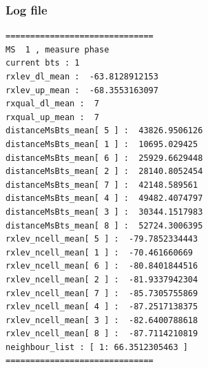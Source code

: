 \documentclass{beamer}
\begin{document}
\begin{frame}[fragile]
\frametitle{Log file}

{\tiny
\begin{verbatim}
==============================
MS  1 , measure phase
current bts : 1
rxlev_dl_mean :  -63.8128912153
rxlev_up_mean :  -68.3553163097
rxqual_dl_mean :  7
rxqual_up_mean :  7
distanceMsBts_mean[ 5 ] :  43826.9506126
distanceMsBts_mean[ 1 ] :  10695.029425
distanceMsBts_mean[ 6 ] :  25929.6629448
distanceMsBts_mean[ 2 ] :  28140.8052454
distanceMsBts_mean[ 7 ] :  42148.589561
distanceMsBts_mean[ 4 ] :  49482.4074797
distanceMsBts_mean[ 3 ] :  30344.1517983
distanceMsBts_mean[ 8 ] :  52724.3006395
rxlev_ncell_mean[ 5 ] :  -79.7852334443
rxlev_ncell_mean[ 1 ] :  -70.461660669
rxlev_ncell_mean[ 6 ] :  -80.8401844516
rxlev_ncell_mean[ 2 ] :  -81.9337942304
rxlev_ncell_mean[ 7 ] :  -85.7305755869
rxlev_ncell_mean[ 4 ] :  -87.2517138375
rxlev_ncell_mean[ 3 ] :  -82.6400788618
rxlev_ncell_mean[ 8 ] :  -87.7114210819
neighbour_list : [ 1: 66.3512305463 ]
==============================
\end{verbatim}
}

\end{frame}
\end{document}
